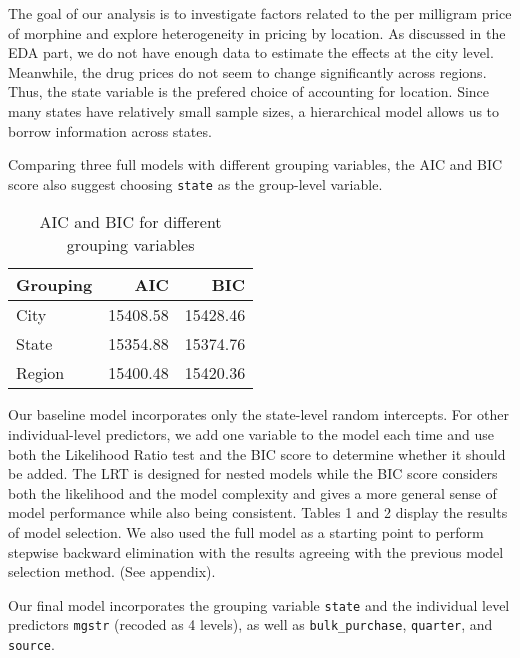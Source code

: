 \documentclass[
  11pt,
]{article}
\begin{document}
The goal of our analysis is to investigate factors related to the per
milligram price of morphine and explore heterogeneity in pricing by
location. As discussed in the EDA part, we do not have enough data to
estimate the effects at the city level. Meanwhile, the drug prices do
not seem to change significantly across regions. Thus, the state
variable is the prefered choice of accounting for location. Since many
states have relatively small sample sizes, a hierarchical model allows
us to borrow information across states.

Comparing three full models with different grouping variables, the AIC
and BIC score also suggest choosing \texttt{state} as the group-level
variable.

\begin{table}

\caption{\label{tab:unnamed-chunk-21}AIC and BIC for different grouping variables}
\centering
\begin{tabular}[t]{l|r|r}
\hline
Grouping & AIC & BIC\\
\hline
City & 15408.58 & 15428.46\\
\hline
State & 15354.88 & 15374.76\\
\hline
Region & 15400.48 & 15420.36\\
\hline
\end{tabular}
\end{table}

Our baseline model incorporates only the state-level random intercepts.
For other individual-level predictors, we add one variable to the model
each time and use both the Likelihood Ratio test and the BIC score to
determine whether it should be added. The LRT is designed for nested
models while the BIC score considers both the likelihood and the model
complexity and gives a more general sense of model performance while
also being consistent. Tables 1 and 2 display the results of model
selection. We also used the full model as a starting point to perform
stepwise backward elimination with the results agreeing with the
previous model selection method. (See appendix).

Our final model incorporates the grouping variable \texttt{state} and
the individual level predictors \texttt{mgstr} (recoded as 4 levels), as
well as \texttt{bulk\_purchase}, \texttt{quarter}, and \texttt{source}.
\end{document}
